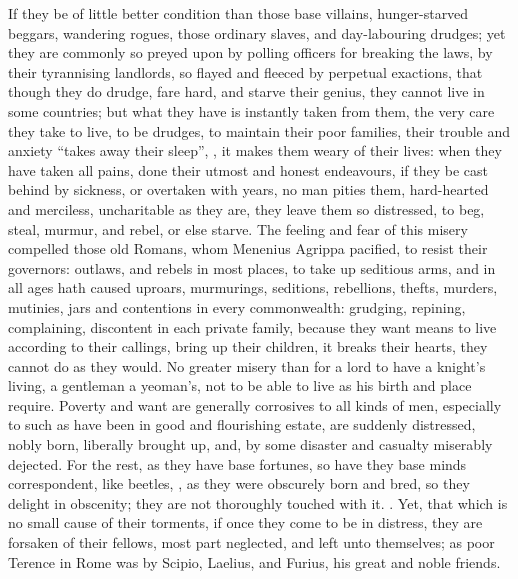 If they be of little better condition than those base villains, hunger-starved
beggars, wandering rogues, those ordinary slaves, and day-labouring drudges;
yet they are commonly so preyed upon by polling officers
for breaking the laws, by their tyrannising landlords, so flayed and fleeced by
perpetual exactions, that though they do drudge, fare
hard, and starve their genius, they cannot live in some
countries; but what they have is instantly taken from them, the very care they
take to live, to be drudges, to maintain their poor families, their trouble and
anxiety \enquote{takes away their sleep}, , it makes them
weary of their lives: when they have taken all pains, done their utmost and
honest endeavours, if they be cast behind by sickness, or overtaken with years,
no man pities them, hard-hearted and merciless, uncharitable as they are, they
leave them so distressed, to beg, steal, murmur, and
rebel, or else starve. The feeling and fear of this misery
compelled those old Romans, whom Menenius Agrippa pacified, to resist their
governors: outlaws, and rebels in most places, to take up seditious arms, and
in all ages hath caused uproars, murmurings, seditions, rebellions, thefts,
murders, mutinies, jars and contentions in every commonwealth: grudging,
repining, complaining, discontent in each private family, because they want
means to live according to their callings, bring up their children, it breaks
their hearts, they cannot do as they would. No greater misery than for a lord
to have a knight's living, a gentleman a yeoman's, not to be able to live as
his birth and place require. Poverty and want are generally corrosives to all
kinds of men, especially to such as have been in good and flourishing estate,
are suddenly distressed, nobly born, liberally brought up,
and, by some disaster and casualty miserably dejected. For the rest, as they
have base fortunes, so have they base minds correspondent, like beetles, , as they were obscurely
born and bred, so they delight in obscenity; they are not thoroughly touched
with it. .
Yet, that which is no small cause of their torments, if once they come to be in
distress, they are forsaken of their fellows, most part neglected, and left
unto themselves; as poor Terence in Rome was by Scipio,
Laelius, and Furius, his great and noble friends.

